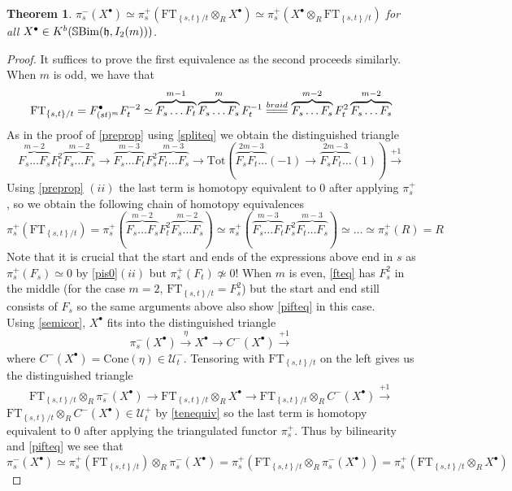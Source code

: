 \documentclass[10pt]{article}
\newtheorem{theorem}{Theorem}
\numberwithin{theorem}{section}
\theoremstyle{definition}
\newcommand{\Uc}{\mathcal{U}}
\newcommand{\hf}{\mathfrak{h}}
\newcommand{\sbim}{\mathbb{S}\textnormal{Bim}}
\newcommand{\paren}[1]{\left( #1 \right)}
\newcommand{\set}[1]{\left \{ #1 \right \}}
\newcommand{\ft}{\mathrm{FT}}
\newcommand{\cone}{\mathrm{Cone}}
\newcommand{\xequals}[1]{\overset{#1}{=\joinrel=\joinrel=}}
\newcommand{\0}{\ \raisebox{-2ex}{\begin{tikzpicture}[xscale=0.25,yscale=0.3,thick,baseline]
 \draw (0,0) -- (0,3); 
\end{tikzpicture}}}
\renewcommand{\1}{\ \raisebox{-2ex}{\begin{tikzpicture}[xscale=0.25,yscale=0.3,thick,baseline]
 \draw (0,0) -- (0,1);
 \draw (0,2) -- (0,3);
 \node[dot] at (0,1) {};
  \node[dot] at (0,2) {};
\end{tikzpicture}}}
\begin{document}
\begin{theorem}
\label{relsertheorem}
    $\pi_s^-(X^\bullet)\simeq \pi_s^+( \ft_{\set{s,t}/t}\otimes_R X^\bullet )\simeq \pi_s^+(X^\bullet\otimes_R \ft_{\set{s,t}/t} )$ for all $X^\bullet\in K^b(\sbim(\hf, I_2(m)))$.
\end{theorem}
\begin{proof}
It suffices to prove the first equivalence as the second proceeds similarly. When $m$ is odd, we have that 
   \begin{equation}
   \label{fteq}
       \ft_{\set{s,t}/t}=F^\bullet_{(st)^m}F_t^{-2}\simeq\overbrace{F_s\ldots F_t}^{m-1}\overbrace{F_s\ldots F_s}^{m} F_t^{-1}\xequals{braid}  \overbrace{F_s\ldots F_s}^{m-2}F_t^2\overbrace{F_s\ldots F_s}^{m-2}  
   \end{equation} 
   As in the proof of \cref{preprop} using \cref{spliteq} we obtain the distinguished triangle
   \[ \overbrace{F_s\ldots F_s}^{m-2 }F_t^2\overbrace{F_s\ldots F_s}^{m-2 }\to \overbrace{F_s\ldots F_t}^{m -3}F_s^2\overbrace{F_t\ldots F_s}^{m -3}\to  \mathrm{Tot}\paren{\overbrace{F_sF_t\ldots}^{2m-3}(-1)\to\overbrace{F_sF_t\ldots}^{2m-3 }(1) } \xrightarrow{+1}\]
   Using \cref{preprop} $(ii)$ the last term is homotopy equivalent to 0 after applying $\pi_s^+$, so we obtain the following chain of homotopy equivalences
   \begin{equation}
   \label{pifteq}
    \pi_s^+\paren{  \ft_{\set{s,t}/t}}=  \pi_s^+\paren{  \overbrace{F_s\ldots F_s}^{m-2 }F_t^2\overbrace{F_s\ldots F_s}^{m-2 }}\simeq \pi_s^+\paren{  \overbrace{F_s\ldots F_t}^{m-3 }F_s^2\overbrace{F_t\ldots F_s}^{m -3}}\simeq \ldots \simeq \pi_s^+\paren{R}=R  
   \end{equation} 
   Note that it is crucial that the start and ends of the expressions above end in $s$ as  $\pi_s^+(F_s)\simeq 0$ by \cref{pis0}$(ii)$ but $\pi_s^+(F_t)\not\simeq 0$! When $m$ is even, \cref{fteq} has $F_s^2$ in the middle (for the case $m=2$, $\ft_{\set{s,t}/t}=F_s^2$) but the start and end still consists of $F_s$ so the same arguments above also show \cref{pifteq} in this case. \\

   Using \cref{semicor}, $X^\bullet$ fits into the distinguished triangle
   \[  \pi_s^-(X^\bullet)\xrightarrow{\eta} X^\bullet \to C^-(X^\bullet)\xrightarrow{+1}  \]
   where $C^-(X^\bullet)=\cone(\eta)\in \Uc^-_t$. Tensoring with $ \ft_{\set{s,t}/t}$ on the left gives us the distinguished triangle
   \[  \ft_{\set{s,t}/t}\otimes_R \pi_s^-(X^\bullet)\to  \ft_{\set{s,t}/t}\otimes_R X^\bullet \to  \ft_{\set{s,t}/t}\otimes_R C^-(X^\bullet)\xrightarrow{+1}  \]
  $\ft_{\set{s,t}/t}\otimes_R C^-(X^\bullet)\in \Uc_t^+$ by \cref{tenequiv} so the last term is homotopy equivalent to 0 after applying the triangulated functor $\pi_s^+$. Thus by bilinearity and \cref{pifteq} we see that
  \begin{equation}
  \label{relsereq}
  \pi_s^-(X^\bullet)\simeq \pi_s^+\paren{\ft_{\set{s,t}/t}}\otimes_R \pi_s^-(X^\bullet)= \pi_s^+\paren{\ft_{\set{s,t}/t}\otimes_R \pi_s^-(X^\bullet)}=   \pi_s^+\paren{\ft_{\set{s,t}/t}\otimes_R X^\bullet} 
  \end{equation}
\end{proof}
\end{document}

